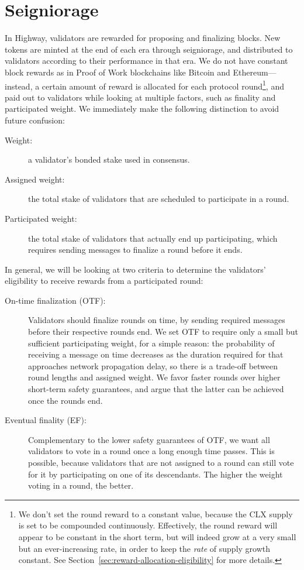 \section{Seigniorage}

In Highway, validators are rewarded for proposing and finalizing blocks. New tokens are minted at the end of each era through seigniorage, and distributed to validators according to their performance in that era. We do not have constant block rewards as in Proof of Work blockchains like Bitcoin and Ethereum---instead, a certain amount of reward is allocated for each protocol round\footnote{We don't set the round reward to a constant value, because the CLX supply is set to be compounded continuously. Effectively, the round reward will appear to be constant in the short term, but will indeed grow at a very small but an ever-increasing rate, in order to keep the \emph{rate} of supply growth constant. See Section~\ref{sec:reward-allocation-eligibility} for more details.}, and paid out to validators while looking at multiple factors, such as finality and participated weight. We immediately make the following distinction to avoid future confusion:

\begin{description}
\item[Weight:] a validator's bonded stake used in consensus.
\item[Assigned weight:] the total stake of validators that are scheduled to participate in a round.
\item[Participated weight:] the total stake of validators that actually end up participating, which requires sending messages to finalize a round before it ends.
\end{description}

In general, we will be looking at two criteria to determine the validators' eligibility to receive rewards from a participated round:

\begin{description}
\item[On-time finalization (OTF):] Validators should finalize rounds on time, by sending required messages before their respective rounds end. We set OTF to require only a small but sufficient participating weight, for a simple reason: the probability of receiving a message on time decreases as the duration required for that approaches network propagation delay, so there is a trade-off between round lengths and assigned weight. We favor faster rounds over higher short-term safety guarantees, and argue that the latter can be achieved once the rounds end.
\item[Eventual finality (EF):] Complementary to the lower safety guarantees of OTF, we want all validators to vote in a round once a long enough time passes. This is possible, because validators that are not assigned to a round can still vote for it by participating on one of its descendants. The higher the weight voting in a round, the better.
\end{description}

